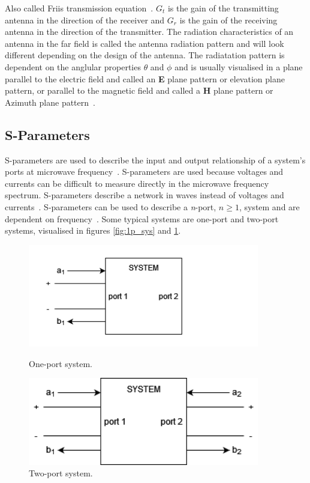 Also called Friis transmission equation~\cite[pp. 1.10-1.11]{ant_eng_hk}. $G_t$ is the gain of the transmitting antenna in the direction of the receiver and $G_r$ is the gain of the receiving antenna in the direction of the transmitter. The radiation characteristics of an antenna in the far field is called the antenna radiation pattern and will look different depending on the design of the antenna. The radiatation pattern is dependent on the anglular properties $\theta$ and $\phi$ and is usually visualised in a plane parallel to the electric field and called an \textbf{E} plane pattern or elevation plane pattern, or parallel to the magnetic field and called a \textbf{H} plane pattern or Azimuth plane pattern~\cite[p. 79-80]{direct_energy}\cite[p. 13-14]{ant_beam_form}.

\subsection{S-Parameters} \label{ss:s_params}
S-parameters are used to describe the input and output relationship of a system's ports at microwave frequency~\cite{s_params}. S-parameters are used because voltages and currents can be difficult to measure directly in the microwave frequency spectrum. S-parameters describe a network in waves instead of voltages and currents~\cite{ming_notes}. S-parameters can be used to describe a \textit{n}-port, $n\geq1$, system and are dependent on frequency~\cite{s_params}. Some typical systems are one-port and two-port systems, visualised in figures \ref{fig:1p_sys} and \ref{fig:2p_sys}.
\begin{figure}[H]
    \begin{minipage}{0.45\textwidth}
        \centering
        \includegraphics[width=0.9\textwidth]{figures/1p_system.png} %
        \caption{One-port system.} \label{fig:1p_sys}
    \end{minipage}\hfill
    \begin{minipage}{0.45\textwidth}
        \centering
        \includegraphics[width=0.9\textwidth]{figures/2p_systen.png} %
        \caption{Two-port system.} \label{fig:2p_sys}
    \end{minipage}
\end{figure}

